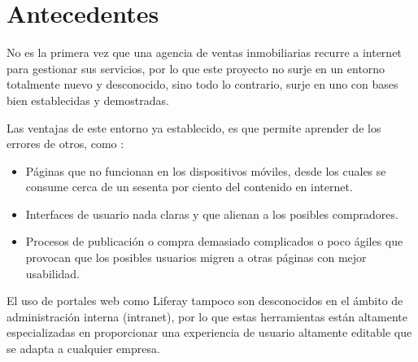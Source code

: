 \chapter{Antecedentes}
\par No es la primera vez que una agencia de ventas inmobiliarias recurre a internet para gestionar sus servicios, por lo que este proyecto no surje en un entorno totalmente nuevo y desconocido, sino todo lo contrario, surje en uno con bases bien establecidas y demostradas.

\par Las ventajas de este entorno ya establecido, es que permite aprender de los errores de otros, como :
\begin{itemize}[-]
	\item Páginas que no funcionan en los dispositivos móviles, desde los cuales se consume cerca de un sesenta por ciento del contenido en internet.
	\item Interfaces de usuario nada claras y que alienan a los posibles compradores.
	\item Procesos de publicación o compra demasiado complicados o poco ágiles que provocan que los posibles usuarios migren a otras páginas con mejor usabilidad.
\end{itemize}

\par El uso de portales web como Liferay tampoco son desconocidos en el ámbito de administración interna (intranet), por lo que estas herramientas están altamente especializadas en proporcionar una experiencia de usuario altamente editable que se adapta a cualquier empresa.
